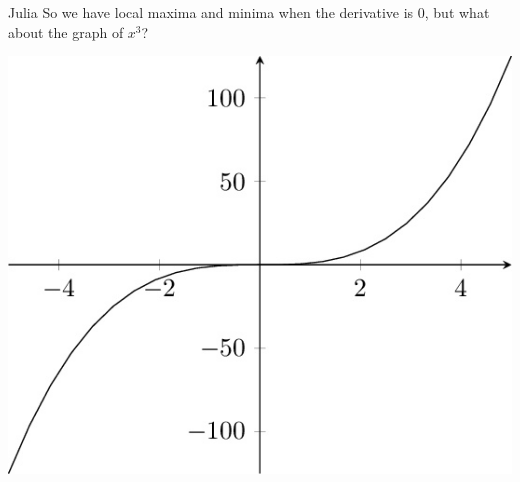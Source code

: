 \documentclass{ximera}
\begin{document}
\begin{dialogue}
\item[Julia] So we have local maxima and minima when the derivative is 0, but what about the graph of $x^3$?
\end{dialogue}

\begin{image}
\includegraphics[scale=.3]{00001}
\end{image}
\end{document}
